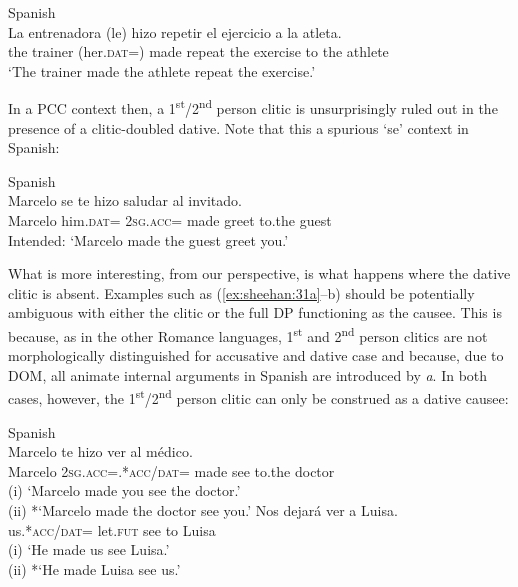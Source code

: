 \documentclass[output=paper,colorlinks,citecolor=brown,nonflat]{langsci/langscibook}
\begin{document}
\ea%
    \label{ex:sheehan:29}
    Spanish \citep[448]{Torrego2010}\\
    \gll    La   entrenadora  (le)   hizo   repetir  el   ejercicio   a     la   atleta.\\
            the   trainer   (her.\textsc{dat}=)   made   repeat  the   exercise   to   the  athlete\\
    \glt    ‘The trainer made the athlete repeat the exercise.’
\z

In a PCC context then, a 1\textsuperscript{st}/2\textsuperscript{nd} person clitic is unsurprisingly ruled out in the presence of a clitic-doubled dative. Note that this a spurious ‘se’ context in Spanish:

\newpage
\ea%
    \label{ex:sheehan:30}
    Spanish\\
    \gll    *Marcelo   se   te   hizo   saludar  al   invitado.\\
            Marcelo   him.\textsc{dat}=  \textsc{2sg}.\textsc{acc}=  made   greet  to.the   guest\\
    \glt    Intended: ‘Marcelo made the guest greet you.’
\z

What is more interesting, from our perspective, is what happens where the dative clitic is absent. Examples such as (\ref{ex:sheehan:31a}--b) should be potentially ambiguous with either the clitic or the full DP functioning as the causee. This is because, as in the other Romance languages, 1\textsuperscript{st} and 2\textsuperscript{nd} person clitics are not morphologically distinguished for accusative and dative case and because, due to DOM, all animate internal arguments in Spanish are introduced by \textit{a}.  In both cases, however, the 1\textsuperscript{st}/2\textsuperscript{nd} person clitic can only be construed as a dative causee:

\ea%
    \label{ex:sheehan:31}
    Spanish\\
    \ea\label{ex:sheehan:31a}
    \gll    Marcelo   te     hizo     ver   al   médico.\\
            Marcelo   2\textsc{sg}.\textsc{acc}=.*\textsc{acc/dat=}  made  see     to.the   doctor\\
    \glt    (i) ‘Marcelo made you see the doctor.’\\
            (ii) *‘Marcelo made the doctor see you.’
    \ex\label{ex:sheehan:31b}
    \gll    Nos  dejará   ver   a   Luisa.\\
            us.*\textsc{acc/dat=}   let.\textsc{fut}  see   to   Luisa\\
    \glt    (i) ‘He made us see Luisa.’\\
            (ii) *‘He made Luisa see us.’
    \z
\z
\end{document}
